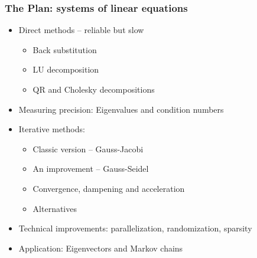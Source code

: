 \documentclass[bigger]{beamer}
\begin{document}
\begin{frame}%

\frametitle{The Plan: systems of linear equations}

\begin{itemize}
\item Direct methods -- reliable but slow

\begin{itemize}
\item Back substitution

\item LU decomposition

\item QR and Cholesky decompositions
\end{itemize}

\item Measuring precision: Eigenvalues and condition numbers

\item Iterative methods:

\begin{itemize}
\item Classic version -- Gauss-Jacobi

\item An improvement -- Gauss-Seidel

\item Convergence, dampening and acceleration

\item Alternatives
\end{itemize}

\item Technical improvements: parallelization, randomization, sparsity

\item Application: Eigenvectors and Markov chains

\end{itemize}


\end{frame}%
\end{document}
